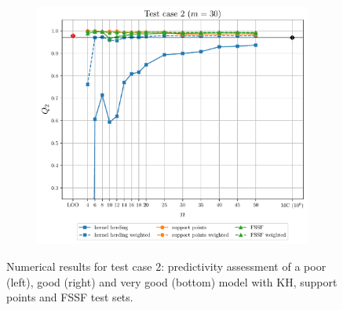 \begin{figure}
\begin{subfigure}[b]{0.49\linewidth}
  \end{subfigure}
  \centering
  \begin{subfigure}[b]{0.49\linewidth}
    \centering
    \includegraphics[width=\linewidth]{./part2/figures/SIS/cosin_learnsize_30.pdf}
  \end{subfigure}
  \caption{Numerical results for test case 2: predictivity assessment of a poor (left), good (right) and very good (bottom) model with KH, support points and FSSF test sets.}
  \label{fig:cosin_benchmark}
\end{figure}

